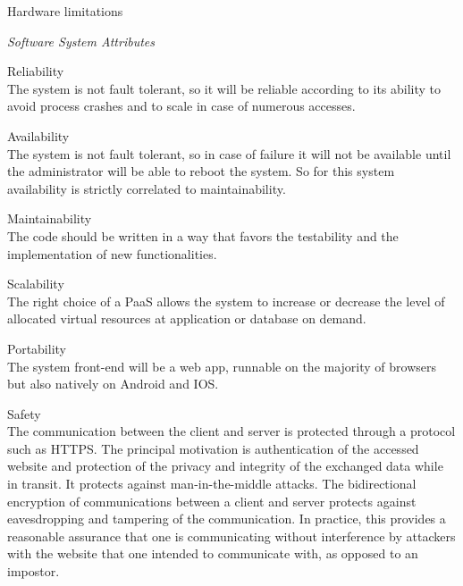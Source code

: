 \documentclass{article}
\begin{document}
\begin{legal}
\begin{legal}
\begin{legal}
			\item Hardware limitations
			\end{legal}
    		\item \textit{Software System Attributes }\\
		\begin{legal}\bfseries
			\item Reliability\\
			{\normalfont The system is not fault tolerant, so it will be reliable according to its ability to avoid process crashes and to scale in case of numerous accesses.}
			\\
			\item Availability\\
			{\normalfont The system is not fault tolerant, so in case of failure it will not be available until the administrator will be able to reboot the system. So for this system availability is strictly correlated to maintainability.}
			\\
			\item Maintainability\\
			{\normalfont The code should be written in a way that favors the testability and the implementation of new functionalities.}
			\\
			\item Scalability\\
			{\normalfont The right choice of a PaaS allows the system to increase or decrease the level of allocated virtual resources at application or database on demand.}
			\\
			\item Portability\\
			{\normalfont The system front-end will be a web app, runnable on the majority of browsers but also natively on Android and IOS.}
			\\
			\item Safety\\
			{\normalfont The communication between the client and server is protected through a protocol such as HTTPS. The principal motivation is authentication of the accessed website and protection of the privacy and integrity of the exchanged data while in transit. It protects against man-in-the-middle attacks. The bidirectional encryption of communications between a client and server protects against eavesdropping and tampering of the communication. In practice, this provides a reasonable assurance that one is communicating without interference by attackers with the website that one intended to communicate with, as opposed to an impostor. 			}

\end{legal}
\end{legal}
\end{legal}
\end{document}
